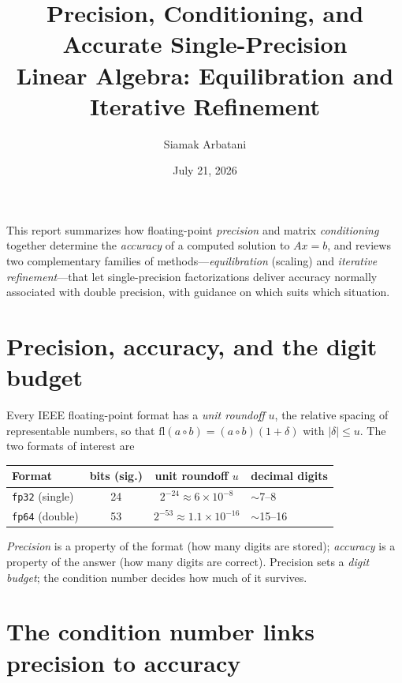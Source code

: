\documentclass[11pt]{article}
\title{\vspace{-2.5em}Precision, Conditioning, and Accurate Single-Precision\\
Linear Algebra: Equilibration and Iterative Refinement}
\author{Siamak Arbatani}
\date{July 21, 2026}
\begin{document}
\maketitle
\vspace{-2em}

\noindent\small This report summarizes how floating-point \emph{precision} and matrix
\emph{conditioning} together determine the \emph{accuracy} of a computed solution to
$Ax=b$, and reviews two complementary families of methods---\emph{equilibration}
(scaling) and \emph{iterative refinement}---that let single-precision factorizations
deliver accuracy normally associated with double precision, with guidance on which suits
which situation.\normalsize

\section{Precision, accuracy, and the digit budget}

Every IEEE floating-point format has a \emph{unit roundoff} $u$, the relative
spacing of representable numbers, so that $\mathrm{fl}(a\circ b)=(a\circ b)(1+\delta)$
with $|\delta|\le u$. The two formats of interest are

\begin{center}\small
\begin{tabular}{lccl}
\toprule
Format & bits (sig.) & unit roundoff $u$ & decimal digits \\
\midrule
\texttt{fp32} (single) & 24 & $2^{-24}\approx 6\times10^{-8}$ & $\sim$7--8 \\
\texttt{fp64} (double) & 53 & $2^{-53}\approx 1.1\times10^{-16}$ & $\sim$15--16 \\
\bottomrule
\end{tabular}\normalsize
\end{center}

\noindent \emph{Precision} is a property of the format (how many digits are stored);
\emph{accuracy} is a property of the answer (how many digits are correct). Precision
sets a \emph{digit budget}; the condition number decides how much of it survives.

\section{The condition number links precision to accuracy}
\end{document}

